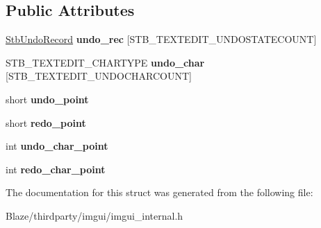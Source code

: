 \subsection*{Public Attributes}
\begin{DoxyCompactItemize}
\item 
\mbox{\label{structImStb_1_1StbUndoState_a0cac31054133ca474b349647e74b8edc}} 
\hyperlink{structImStb_1_1StbUndoRecord}{Stb\+Undo\+Record} {\bfseries undo\+\_\+rec} \mbox{[}S\+T\+B\+\_\+\+T\+E\+X\+T\+E\+D\+I\+T\+\_\+\+U\+N\+D\+O\+S\+T\+A\+T\+E\+C\+O\+U\+NT\mbox{]}
\item 
\mbox{\label{structImStb_1_1StbUndoState_a244b386e1412da6b8ab87a952d01f4f7}} 
S\+T\+B\+\_\+\+T\+E\+X\+T\+E\+D\+I\+T\+\_\+\+C\+H\+A\+R\+T\+Y\+PE {\bfseries undo\+\_\+char} \mbox{[}S\+T\+B\+\_\+\+T\+E\+X\+T\+E\+D\+I\+T\+\_\+\+U\+N\+D\+O\+C\+H\+A\+R\+C\+O\+U\+NT\mbox{]}
\item 
\mbox{\label{structImStb_1_1StbUndoState_a2c4fd577dd35315aeade038ea01f3bff}} 
short {\bfseries undo\+\_\+point}
\item 
\mbox{\label{structImStb_1_1StbUndoState_a0f2146b1a6ab1419283b376c7506a001}} 
short {\bfseries redo\+\_\+point}
\item 
\mbox{\label{structImStb_1_1StbUndoState_a5821d093de03804669009f6fdfadff5b}} 
int {\bfseries undo\+\_\+char\+\_\+point}
\item 
\mbox{\label{structImStb_1_1StbUndoState_a66518921e877f0ffc472dc44a46e538a}} 
int {\bfseries redo\+\_\+char\+\_\+point}
\end{DoxyCompactItemize}


The documentation for this struct was generated from the following file\+:\begin{DoxyCompactItemize}
\item 
Blaze/thirdparty/imgui/imgui\+\_\+internal.\+h\end{DoxyCompactItemize}
